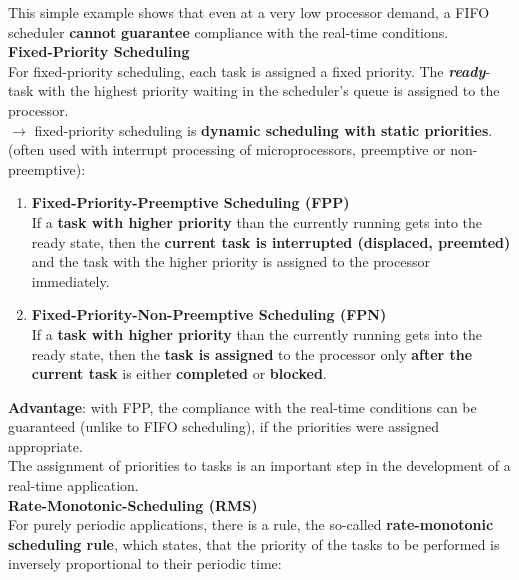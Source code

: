 This simple example shows that even at a very low processor demand, a FIFO scheduler \textbf{cannot} \textbf{guarantee} compliance with the real-time conditions.\\

{\rot\bf Fixed-Priority Scheduling}\\

For fixed-priority scheduling, each task is assigned a fixed priority. The \textbf{\textit{ready}}-task with the highest priority waiting in the scheduler's queue is assigned to the processor.  \\
$\rightarrow$ fixed-priority scheduling is\textbf{ dynamic scheduling with static priorities}. (often used with interrupt processing of microprocessors, preemptive or non-preemptive):

\begin{enumerate}
	\item  \textbf{Fixed-Priority-Preemptive Scheduling (FPP)}\\
	If a \textbf{task with higher priority} than the currently running gets into the ready state, then the \textbf{current task is interrupted (displaced, preemted)} and the task with the higher priority is assigned to the processor immediately.
	
	\item  \textbf{Fixed-Priority-Non-Preemptive Scheduling (FPN)}\\
	If a \textbf{task with higher priority} than the currently running gets into the ready state, then the \textbf{task is assigned} to the processor only \textbf{after the current task} is either \textbf{completed} or \textbf{blocked}.
\end{enumerate}

\textbf{Advantage}: with FPP, the compliance with the real-time conditions can be guaranteed (unlike to FIFO scheduling), if the priorities were assigned appropriate. \\

The assignment of priorities to tasks is an important step in the development of a real-time application.\\

{\rot\bf Rate-Monotonic-Scheduling (RMS)}\\

For purely periodic applications, there is a rule, the so-called \textbf{rate-monotonic scheduling rule}, which states, that the priority of the tasks to be performed is inversely proportional to their periodic time:

